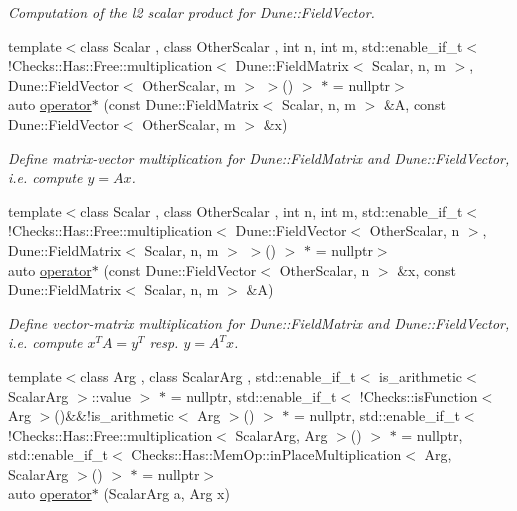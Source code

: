 \begin{DoxyCompactItemize}
\begin{DoxyCompactList}\small\item\em Computation of the l2 scalar product for Dune\-::\-Field\-Vector. \end{DoxyCompactList}\item 
{\footnotesize template$<$class Scalar , class Other\-Scalar , int n, int m, std\-::enable\-\_\-if\-\_\-t$<$ !\-Checks\-::\-Has\-::\-Free\-::multiplication$<$ Dune\-::\-Field\-Matrix$<$ Scalar, n, m $>$, Dune\-::\-Field\-Vector$<$ Other\-Scalar, m $>$ $>$() $>$ $\ast$  = nullptr$>$ }\\auto \hyperlink{namespacefuncy_a835d1e6ece8ca8b6690cf35afd9a834d}{operator$\ast$} (const Dune\-::\-Field\-Matrix$<$ Scalar, n, m $>$ \&A, const Dune\-::\-Field\-Vector$<$ Other\-Scalar, m $>$ \&x)
\begin{DoxyCompactList}\small\item\em Define matrix-\/vector multiplication for Dune\-::\-Field\-Matrix and Dune\-::\-Field\-Vector, i.\-e. compute $y=Ax$. \end{DoxyCompactList}\item 
{\footnotesize template$<$class Scalar , class Other\-Scalar , int n, int m, std\-::enable\-\_\-if\-\_\-t$<$ !\-Checks\-::\-Has\-::\-Free\-::multiplication$<$ Dune\-::\-Field\-Vector$<$ Other\-Scalar, n $>$, Dune\-::\-Field\-Matrix$<$ Scalar, n, m $>$ $>$() $>$ $\ast$  = nullptr$>$ }\\auto \hyperlink{namespacefuncy_ae1a9b8b810ca6084f9d5c4da9a4c504b}{operator$\ast$} (const Dune\-::\-Field\-Vector$<$ Other\-Scalar, n $>$ \&x, const Dune\-::\-Field\-Matrix$<$ Scalar, n, m $>$ \&A)
\begin{DoxyCompactList}\small\item\em Define vector-\/matrix multiplication for Dune\-::\-Field\-Matrix and Dune\-::\-Field\-Vector, i.\-e. compute $x^T A = y^T$ resp. $y=A^T x$. \end{DoxyCompactList}\item 
{\footnotesize template$<$class Arg , class Scalar\-Arg , std\-::enable\-\_\-if\-\_\-t$<$ is\-\_\-arithmetic$<$ Scalar\-Arg $>$\-::value $>$ $\ast$  = nullptr, std\-::enable\-\_\-if\-\_\-t$<$ !\-Checks\-::is\-Function$<$ Arg $>$()\&\&!is\-\_\-arithmetic$<$ Arg $>$() $>$ $\ast$  = nullptr, std\-::enable\-\_\-if\-\_\-t$<$ !\-Checks\-::\-Has\-::\-Free\-::multiplication$<$ Scalar\-Arg, Arg $>$() $>$ $\ast$  = nullptr, std\-::enable\-\_\-if\-\_\-t$<$ Checks\-::\-Has\-::\-Mem\-Op\-::in\-Place\-Multiplication$<$ Arg, Scalar\-Arg $>$() $>$ $\ast$  = nullptr$>$ }\\auto \hyperlink{namespacefuncy_aa27c0885f7cedb6260fadc492790dfbd}{operator$\ast$} (Scalar\-Arg a, Arg x)

\end{DoxyCompactItemize}
